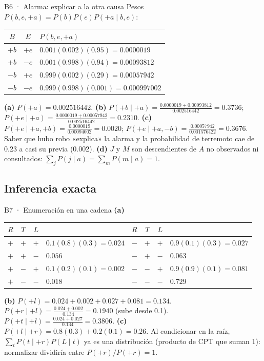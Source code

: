 \begin{solucion}{B6 · Alarma: explicar a la otra causa}
Pesos $P(b,e,+a)=P(b)P(e)P(+a\mid b,e)$:
\begin{center}\small
\begin{tabular}{cc|l}
$B$ & $E$ & $P(b,e,+a)$\\\hline
$+b$ & $+e$ & $0.001(0.002)(0.95)=0.0000019$\\
$+b$ & $-e$ & $0.001(0.998)(0.94)=0.00093812$\\
$-b$ & $+e$ & $0.999(0.002)(0.29)=0.00057942$\\
$-b$ & $-e$ & $0.999(0.998)(0.001)=0.000997002$
\end{tabular}
\end{center}
\textbf{(a)} $P(+a)=\mathbf{0.002516442}$.
\textbf{(b)} $P(+b\mid+a)=\frac{0.0000019+0.00093812}{0.002516442}=\mathbf{0.3736}$; \quad $P(+e\mid+a)=\frac{0.0000019+0.00057942}{0.002516442}=\mathbf{0.2310}$.
\textbf{(c)} $P(+e\mid+a,+b)=\frac{0.0000019}{0.00094002}=\mathbf{0.0020}$; \quad $P(+e\mid+a,-b)=\frac{0.00057942}{0.001576422}=\mathbf{0.3676}$.
Saber que hubo robo «explica» la alarma y la probabilidad de terremoto cae de 0.23 a casi su previa (0.002).
\textbf{(d)} $J$ y $M$ son descendientes de $A$ no observados ni consultados: $\sum_jP(j\mid a)=\sum_mP(m\mid a)=1$.
\end{solucion}

\subsection{Inferencia exacta}

\begin{solucion}{B7 · Enumeración en una cadena}
\textbf{(a)}
\begin{center}\small
\begin{tabular}{ccc|l@{\qquad}ccc|l}
$R$&$T$&$L$& & $R$&$T$&$L$&\\\hline
$+$&$+$&$+$& $0.1(0.8)(0.3)=0.024$ & $-$&$+$&$+$& $0.9(0.1)(0.3)=0.027$\\
$+$&$+$&$-$& $0.056$ & $-$&$+$&$-$& $0.063$\\
$+$&$-$&$+$& $0.1(0.2)(0.1)=0.002$ & $-$&$-$&$+$& $0.9(0.9)(0.1)=0.081$\\
$+$&$-$&$-$& $0.018$ & $-$&$-$&$-$& $0.729$
\end{tabular}
\end{center}
\textbf{(b)} $P(+l)=0.024+0.002+0.027+0.081=0.134$.
$P(+r\mid+l)=\frac{0.024+0.002}{0.134}=\mathbf{0.1940}$ (sube desde 0.1). $P(+t\mid+l)=\frac{0.024+0.027}{0.134}=\mathbf{0.3806}$.
\textbf{(c)} $P(+l\mid+r)=0.8(0.3)+0.2(0.1)=\mathbf{0.26}$. Al condicionar en la raíz, $\sum_tP(t\mid+r)P(L\mid t)$ ya es una distribución
(producto de CPT que suman 1): normalizar dividiría entre $P(+r)/P(+r)=1$.
\end{solucion}

